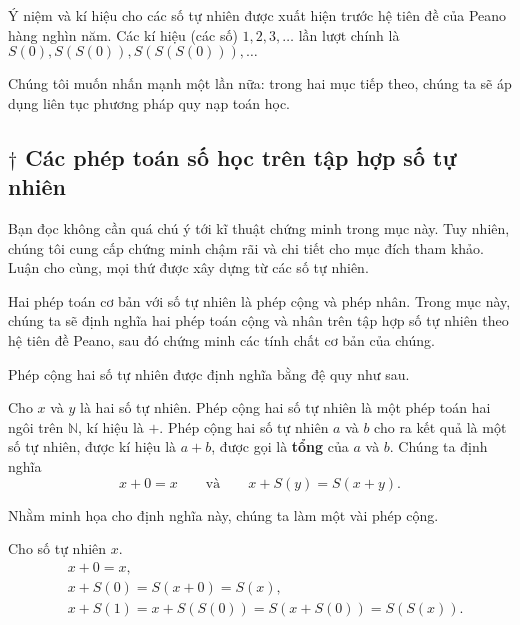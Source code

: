 Ý niệm và kí hiệu cho các số tự nhiên được xuất hiện trước hệ tiên đề của Peano hàng nghìn năm. Các kí hiệu (các số) $1, 2, 3,\ldots$ lần lượt chính là $S(0), S(S(0)), S(S(S(0))),\ldots$

Chúng tôi muốn nhấn mạnh một lần nữa: trong hai mục tiếp theo, chúng ta sẽ áp dụng liên tục phương pháp quy nạp toán học.

\subsection*{$\dagger$ Các phép toán số học trên tập hợp số tự nhiên}

Bạn đọc không cần quá chú ý tới kĩ thuật chứng minh trong mục này. Tuy nhiên, chúng tôi cung cấp chứng minh chậm rãi và chi tiết cho mục đích tham khảo. Luận cho cùng, mọi thứ được xây dựng từ các số tự nhiên.

Hai phép toán cơ bản với số tự nhiên là phép cộng và phép nhân. Trong mục này, chúng ta sẽ định nghĩa hai phép toán cộng và nhân trên tập hợp số tự nhiên theo hệ tiên đề Peano, sau đó chứng minh các tính chất cơ bản của chúng.

Phép cộng hai số tự nhiên được định nghĩa bằng đệ quy như sau.

\begin{definition}
	Cho $x$ và $y$ là hai số tự nhiên. Phép cộng hai số tự nhiên là một phép toán hai ngôi trên $\mathbb{N}$, kí hiệu là $+$. Phép cộng hai số tự nhiên $a$ và $b$ cho ra kết quả là một số tự nhiên, được kí hiệu là $a + b$, được gọi là \textbf{tổng} của $a$ và $b$. Chúng ta định nghĩa
	\[
		x + 0 = x\qquad\text{và}\qquad x + S(y) = S(x + y).
	\]
\end{definition}

Nhằm minh họa cho định nghĩa này, chúng ta làm một vài phép cộng.
\begin{example}
	Cho số tự nhiên $x$.
	\begin{align*}
		 & x + 0 = x,                                      \\
		 & x + S(0) = S(x + 0) = S(x),                     \\
		 & x + S(1) = x + S(S(0)) = S(x + S(0)) = S(S(x)).
	\end{align*}
\end{example}

